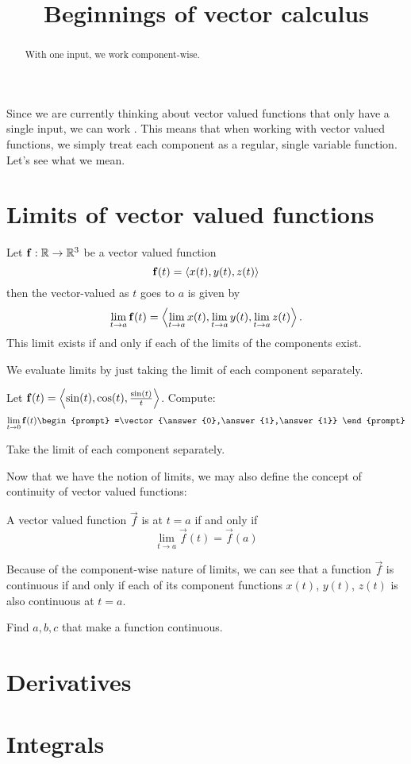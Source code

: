 \documentclass{ximera}
\title[Dig-In:]{Beginnings of vector calculus}
\begin{document}
\begin{abstract}
  With one input, we work component-wise.
\end{abstract}
\maketitle


Since we are currently thinking about vector valued functions that
only have a single input, we can work . This
means that when working with vector valued functions, we simply treat
each component as a regular, single variable function. Let's see what
we mean.

\section{Limits of vector valued functions}

\begin{definition}
  Let $\mathbf{f}:\mathbb R \to \mathbb R^3$ be a vector valued function
  \[
  \mathbf{f}(t) = \left\langle x(t),y(t),z(t)\right\rangle
  \]
  then the vector-valued  as $t$ goes to $a$ is given by 
  \[
  \lim_{t \to a} \mathbf{f}(t) = \left\langle \lim_{t \to a}x(t),\lim_{t \to a}y(t),\lim_{t \to a}z(t)\right\rangle.
  \]
  This limit exists if and only if each of the limits of the
  components exist.
\end{definition}

We evaluate limits by just taking the limit of each component
separately.

\begin{question}
  Let $\mathbf{f}(t) = \left\langle \sin(t),\cos(t),\frac{\sin(t)}{t}\right\rangle$.
  Compute:
  \[
  \lim_{t \to 0} \vec{f}(t)
  \begin{prompt}
    =\vector{\answer{0},\answer{1},\answer{1}}
  \end{prompt}
  \]
  \begin{hint}
    Take the limit of each component separately.
  \end{hint}
\end{question}

Now that we have the notion of limits, we may also define the concept
of continuity of vector valued functions:

\begin{definition}
  A vector valued function $\vec{f}$ is  at $t= a$ if
  and only if
  \[
  \lim_{t \to a} \vec{f}(t)  = \vec{f}(a)
  \]
\end{definition}
Because of the component-wise nature of limits, we can see that a
function $\vec{f}$ is continuous if and only if each of its component
functions $x(t)$, $y(t)$, $z(t)$ is also continuous at $t=a$.

\begin{question}

Find $a,b,c$ that make a function continuous. 

\end{question}


\section{Derivatives}


\section{Integrals}
\end{document}
